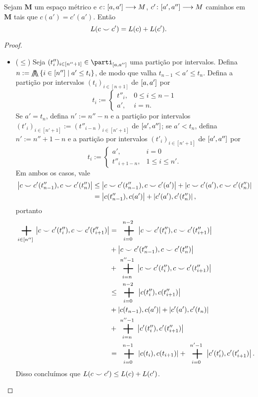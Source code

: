 \begin{proposition}
Sejam $\bm M$ um espaço métrico e ${c}\colon {\left[{a},{a'}\right]} \longrightarrow {M}$, ${c'}\colon {\left[{a'},{a''}\right]} \longrightarrow {M}$ caminhos em $\bm M$ tais que $c(a') = c'(a')$. Então
	\begin{equation*}
	L(c \smile c') = L(c) + L(c').
	\end{equation*}
\end{proposition}
\begin{proof}
	\begin{itemize}
	\item ($\leq$) Seja $(t''_i)_{i \in [n''+1]} \in \parti_{\intff{a}{a''}}$ uma partição por intervalos. Defina $n := \min\set{i \in [n'']}{a' \leq t_i}$, de modo que valha $t_{n-1} < a' \leq t_n$. Defina a partição por intervalos $(t_i)_{i \in [n+1]}$ de $\left[{a},{a'}\right]$ por
		\begin{equation*}
		t_i := \begin{cases}
				t''_i,	& 0 \leq i \leq n-1 \\
				a',		& i = n.
				\end{cases}
		\end{equation*}
	Se $a' = t_n$, defina $n' := n''-n$ e a partição por intervalos $(t'_i)_{i \in [n'+1]} := (t''_{i-n})_{i \in [n'+1]}$ de $\left[{a'},{a''}\right]$; se $a' < t_n$, defina $n' := n''+1-n$ e a partição por intervalos $(t'_i)_{i \in [n'+1]}$ de $\left[{a'},{a''}\right]$ por
		\begin{equation*}
		t_i := \begin{cases}
				a',				& i=0 \\
				t''_{i+1-n},	& 1 \leq i \leq n'.
				\end{cases}
		\end{equation*}
	Em ambos os casos, vale
		\begin{align*}
		\left\vert{c \smile c'(t''_{n-1})},{c \smile c'(t''_n)}\right\vert &\leq \left\vert{c \smile c'(t''_{n-1})},{c \smile c'(a')}\right\vert + \left\vert{c \smile c'(a')},{c \smile c'(t''_n)}\right\vert \\
			&= \left\vert{c(t''_{n-1})},{c(a')}\right\vert + \left\vert{c'(a')},{c'(t''_n)}\right\vert,
		\end{align*}
	portanto
		\begin{align*}
		\sum_{i \in [n'']} \dist{c \conca c'(t''_i)}{c \conca c'(t''_{i+1})} &= \sum_{i=0}^{n-2} \dist{c \conca c'(t''_i)}{c \conca c'(t''_{i+1})} \\
			&+ \dist{c \conca c'(t''_{n-1})}{c \conca c'(t''_n)} \\
			&+ \sum_{i=n}^{n''-1} \dist{c \conca c'(t''_i)}{c \conca c'(t''_{i+1})} \\
			&\leq \sum_{i=0}^{n-2} \dist{c(t''_i)}{c(t''_{i+1})} \\
			&+ \dist{c(t_{n-1})}{c(a')} + \dist{c'(a')}{c'(t_n)} \\
			&+ \sum_{i=n}^{n''-1} \dist{c'(t''_i)}{c'(t''_{i+1})} \\
			&= \sum_{i=0}^{n-1} \dist{c(t_i)}{c(t_{i+1})} + \sum_{i=0}^{n'-1} \dist{c'(t'_i)}{c'(t'_{i+1})}.
		\end{align*}
	Disso concluímos que $L(c \smile c') \leq L(c) + L(c')$.


\end{itemize}
\end{proof}
